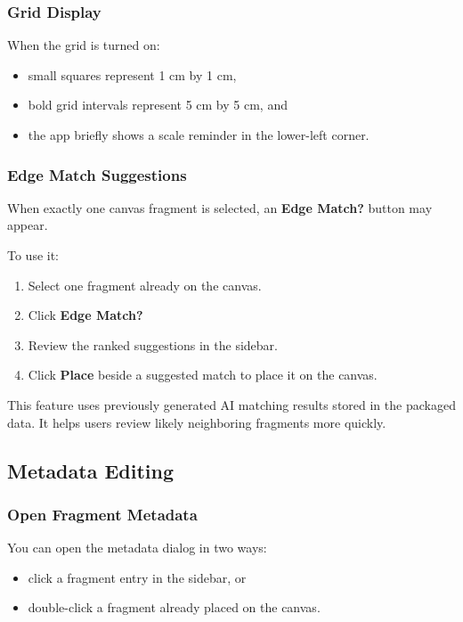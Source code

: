 \documentclass[12pt]{article}
\begin{document}
\subsubsection{Grid Display}
When the grid is turned on:
\begin{itemize}
  \item small squares represent 1 cm by 1 cm,
  \item bold grid intervals represent 5 cm by 5 cm, and
  \item the app briefly shows a scale reminder in the lower-left corner.
\end{itemize}

\subsubsection{Edge Match Suggestions}
When exactly one canvas fragment is selected, an \textbf{Edge Match?} button may appear.

To use it:
\begin{enumerate}
  \item Select one fragment already on the canvas.
  \item Click \textbf{Edge Match?}
  \item Review the ranked suggestions in the sidebar.
  \item Click \textbf{Place} beside a suggested match to place it on the canvas.
\end{enumerate}

This feature uses previously generated AI matching results stored in the packaged data. It helps users review likely neighboring fragments more quickly.

\subsection{Metadata Editing}

\subsubsection{Open Fragment Metadata}
You can open the metadata dialog in two ways:
\begin{itemize}
  \item click a fragment entry in the sidebar, or
  \item double-click a fragment already placed on the canvas.
\end{itemize}
\end{document}
